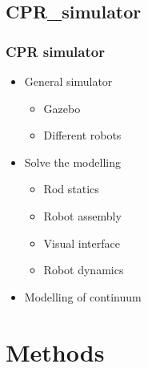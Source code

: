 \documentclass[compress]{thesisbeamer}
\begin{document}
		\subsection{CPR_simulator}
        \begin{frame}
        	\frametitle{CPR simulator}
			\begin{itemize}%
  				\item General simulator 
  				\begin{itemize}%
   					\item Gazebo
   					\item Different robots
  				\end{itemize}
  				\item Solve the modelling
  				\begin{itemize}%
   					\item Rod statics
   					\item Robot assembly
   					\item Visual interface
   					\item Robot dynamics
  				\end{itemize}
  				\item Modelling of continuum
 			\end{itemize}
		\end{frame}


        \section{Methods}
\end{document}
